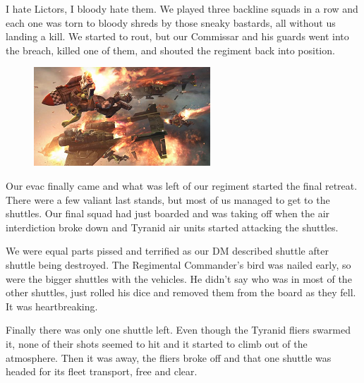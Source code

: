 I hate Lictors, I bloody hate them. 
We played three backline squads in a row and each one was torn to bloody shreds by those sneaky bastards, all without us landing a kill. 
We started to rout, but our Commissar and his guards went into the breach, killed one of them, and shouted the regiment back into position.

\begin{figure}
	\begin{center}
		\includegraphics[width=\figwidth]{pics/1/8.png}
	\end{center}
\end{figure}
Our evac finally came and what was left of our regiment started the final retreat. 
There were a few valiant last stands, but most of us managed to get to the shuttles. 
Our final squad had just boarded and was taking off when the air interdiction broke down and Tyranid air units started attacking the shuttles.

We were equal parts pissed and terrified as our DM described shuttle after shuttle being destroyed. 
The Regimental Commander's bird was nailed early, so were the bigger shuttles with the vehicles. 
He didn't say who was in most of the other shuttles, just rolled his dice and removed them from the board as they fell. 
It was heartbreaking.

Finally there was only one shuttle left. 
Even though the Tyranid fliers swarmed it, none of their shots seemed to hit and it started to climb out of the atmosphere. 
Then it was away, the fliers broke off and that one shuttle was headed for its fleet transport, free and clear.

